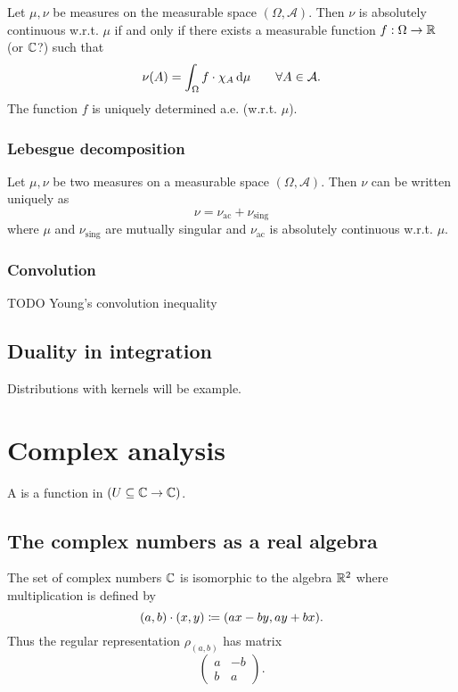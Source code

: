 \begin{theorem}
Let $\mu,\nu$ be measures on the measurable space $(\Omega,\mathcal{A})$. Then $\nu$ is absolutely continuous w.r.t. $\mu$ \textup{if and only if} there exists a measurable function $f:\Omega\to\mathbb{R}$ (or $\mathbb{C}$?) such that
\[ \nu(A) = \int_\Omega f\cdot \chi_A \operatorname{d \!}{\mu} \qquad \forall A\in\mathcal{A}. \]
The function $f$ is uniquely determined a.e. (w.r.t. $\mu$).
\end{theorem}

\subsection{Lebesgue decomposition}
\begin{theorem}
Let $\mu, \nu$ be two measures on a measurable space $(\Omega, \mathcal{A})$. Then $\nu$ can be written uniquely as
\[ \nu = \nu_\text{ac} + \nu_\text{sing} \]
where $\mu$ and $\nu_\text{sing}$ are mutually singular and $\nu_\text{ac}$ is absolutely continuous w.r.t. $\mu$. 

\end{theorem}

\subsection{Convolution}
TODO Young's convolution inequality

\section{Duality in integration}
Distributions with kernels will be example.

\chapter{Complex analysis}
\begin{definition}
A  is a function in $(U\subseteq \mathbb{C} \to \mathbb{C})$.
\end{definition}
\section{The complex numbers as a real algebra}
The set of complex numbers $\mathbb{C}$ is isomorphic to the algebra $\mathbb{R}^2$ where multiplication is defined by
\[ (a, b)\cdot (x, y) \coloneqq (ax-by, ay+bx). \]
Thus the regular representation $\rho_{(a,b)}$ has matrix
\[ \begin{pmatrix}
a & -b \\ b & a
\end{pmatrix}. \]

